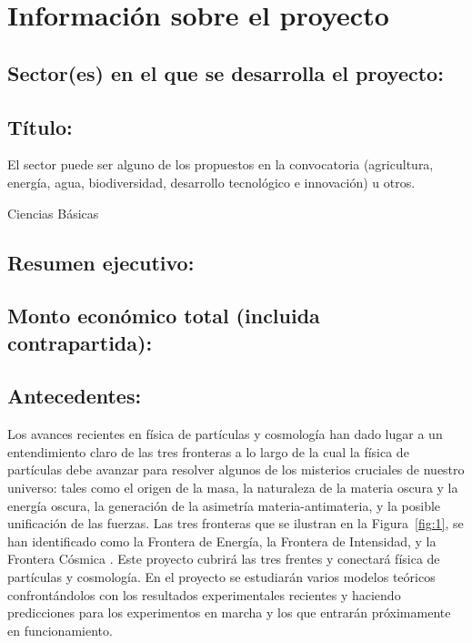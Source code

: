
\section{Información sobre el proyecto}

\subsection{Sector(es)  en el que se desarrolla el proyecto:}


\subsection{Título:                                        }
\begin{instrucciones}
  El sector puede ser alguno de los propuestos en la convocatoria
  (agricultura, energía, agua, biodiversidad, desarrollo tecnológico e
  innovación) u otros.
\end{instrucciones}
Ciencias Básicas
\subsection{Resumen ejecutivo:                            }
\subsection{Monto económico total (incluida contrapartida):}
\subsection{Antecedentes:                                  }
Los avances recientes en física de partículas y cosmología han dado
lugar a un entendimiento claro de las tres fronteras a lo largo de la
cual la física de partículas debe avanzar para resolver algunos de los
misterios cruciales de nuestro universo: tales como el origen de la
masa, la naturaleza de la materia oscura y la energía oscura, la
generación de la asimetría materia-antimateria, y la posible
unificación de las fuerzas. Las tres fronteras que se ilustran en la
Figura~\ref{fig:1}, se han identificado como la Frontera de Energía,
la Frontera de Intensidad, y la Frontera Cósmica \cite{fermilab}. Este
proyecto cubrirá las tres frentes y conectará física de partículas y
cosmología. En el proyecto se estudiarán varios modelos teóricos
confrontándolos con los resultados experimentales recientes y haciendo
predicciones para los experimentos en marcha y los que entrarán
próximamente en funcionamiento.

